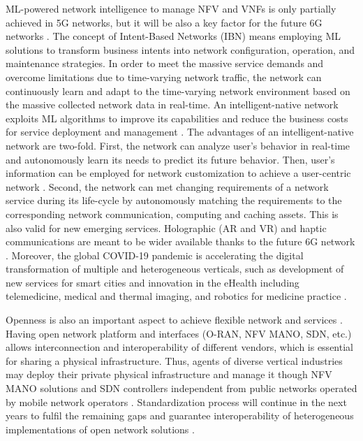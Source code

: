 ML-powered network intelligence to manage NFV and VNFs is only partially achieved in 5G networks, but it will be also a key factor for the future 6G networks \cite{zhou2020service}. The concept of Intent-Based Networks (IBN) \cite{wei2020intent} means employing ML solutions to transform business intents into network configuration, operation, and maintenance strategies. In order to meet the massive service demands and overcome limitations due to time-varying network traffic, the network can continuously learn and adapt to the time-varying network environment based on the massive collected network data in real-time. An intelligent-native network exploits ML algorithms to improve its capabilities and reduce the business costs for service deployment and management \cite{monteil2020resource, chen2020edge}. The advantages of an intelligent-native network are two-fold. First, the network can analyze user’s behavior in real-time and autonomously learn its needs to predict its future behavior. Then, user's information can be employed for network customization to achieve a user-centric network \cite{wang2019intelligent}. Second, the network can met changing requirements of a network service during its life-cycle by autonomously matching the requirements to the corresponding network communication, computing and caching assets. This is also valid for new emerging services. Holographic (AR and VR) and haptic communications are meant to be wider available thanks to the future 6G network \cite{bhat20216g}. Moreover, the global COVID-19 pandemic is accelerating the digital transformation of multiple and heterogeneous verticals, such as development of new services for smart cities and innovation in the eHealth including telemedicine, medical and thermal imaging, and robotics for medicine practice \cite{allam2021future, akhtar2020shift}. 

Openness is also an important aspect to achieve flexible network and services \cite{zhou2020service}. Having open network platform and interfaces (O-RAN, NFV MANO, SDN, etc.) allows interconnection and interoperability of different vendors, which is essential for sharing a physical infrastructure. Thus, agents of diverse vertical industries may deploy their private physical infrastructure and manage it though NFV MANO solutions and SDN controllers independent from public networks operated by mobile network operators \cite{rostami2019private}. Standardization process will continue in the next years to fulfil the remaining gaps and guarantee interoperability of heterogeneous implementations of open network solutions \cite{BONATI2020107516}.

